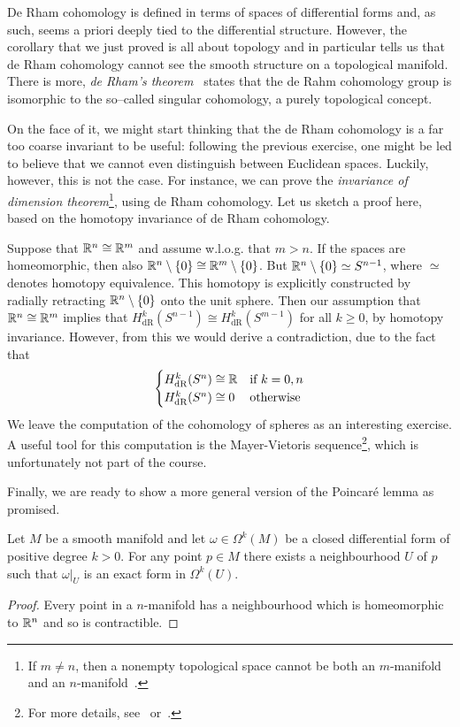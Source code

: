 \begin{remark}\label{rmk:ch_topology_domain_invariance}
  De Rham cohomology is defined in terms of spaces of differential forms and, as such, seems a priori deeply tied to the differential structure. However, the corollary that we just proved is all about topology and in particular tells us that de Rham cohomology cannot see the smooth structure on a topological manifold.
  There is more, \emph{de Rham's theorem}~\cite[Theorem 18.14]{book:lee} states that the de Rahm cohomology group is isomorphic to the so--called singular cohomology, a purely topological concept.

  On the face of it, we might start thinking that the de Rham cohomology is a far too coarse invariant to be useful: following the previous exercise, one might be led to believe that we cannot even distinguish between Euclidean spaces. Luckily, however, this is not the case.
  For instance, we can prove the \emph{invariance of dimension theorem}\footnote{If $m\neq n$, then a nonempty topological space cannot be both an $m$-manifold and an $n$-manifold~\cite[Problem 13-3]{book:lee:topology}.}, using de Rham cohomology. Let us sketch a proof here, based on the homotopy invariance of de Rham cohomology.

  Suppose that $\mathbb{R}^n\cong\mathbb{R}^m$ and assume w.l.o.g. that $m>n$. If the spaces are homeomorphic, then also $\mathbb{R}^n\setminus\{0\}\cong\mathbb{R}^m\setminus\{0\}$. But $\mathbb{R}^n\setminus\{0\}\simeq S^{n-1}$, where $\simeq$ denotes homotopy equivalence. This homotopy is explicitly constructed by radially retracting $\mathbb{R}^n\setminus\{0\}$ onto the unit sphere. Then our assumption that $\mathbb{R}^n\cong\mathbb{R}^m$ implies that $H^k_{\mathrm{dR}}(S^{n-1})\cong H^k_{\mathrm{dR}}(S^{m-1})$ for all $k\geq 0$,
  by homotopy invariance. However, from this we would derive a contradiction, due to the fact that
  \begin{equation}
    \begin{cases}
      H_{\mathrm{dR}}^k(S^n)\cong\mathbb{R} & \mbox{if }k=0,n\\
      H_{\mathrm{dR}}^k(S^n)\cong 0 & \mbox{otherwise}
    \end{cases}
  \end{equation}
  We leave the computation of the cohomology of spheres as an interesting exercise.
  A useful tool for this computation is the Mayer-Vietoris sequence\footnote{For more details, see~\cite[Chapter 17.3]{book:lee} or~\cite[Chapter 26]{book:tu}.}, which is unfortunately not part of the course.
\end{remark}

Finally, we are ready to show a more general version of the Poincar\'e lemma as promised.

\begin{corollary}\label{cor:plemma}
  Let $M$ be a smooth manifold and let $\omega\in\Omega^k(M)$ be a closed differential form of positive degree $k>0$.
  For any point $p\in M$ there exists a neighbourhood $U$ of $p$ such that $\omega|_U$ is an exact form in $\Omega^k(U)$.
\end{corollary}
\begin{proof}
  Every point in a $n$-manifold has a neighbourhood which is homeomorphic to $\mathbb{R}^n$ and so is contractible.
\end{proof}
